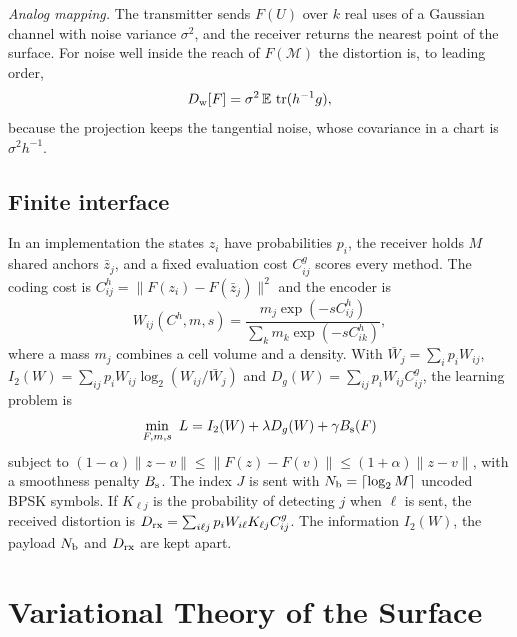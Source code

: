 \documentclass[journal]{IEEEtran}
\newcommand{\E}{\mathbb E}
\newcommand{\M}{\mathcal M}
\DeclareMathOperator{\tr}{tr}
\begin{document}
\emph{Analog mapping.} The transmitter sends $F(U)$ over $k$ real uses of a Gaussian channel with noise variance $\sigma^2$, and the receiver returns the nearest point of the surface. For noise well inside the reach of $F(\M)$ the distortion is, to leading order,
\begin{equation}
 D_{\rm w}[F]=\sigma^2\,\E\,\tr(h^{-1}g), \label{eq:weak}
\end{equation}
because the projection keeps the tangential noise, whose covariance in a chart is $\sigma^2h^{-1}$.

\subsection{Finite interface}
In an implementation the states $z_i$ have probabilities $p_i$, the receiver holds $M$ shared anchors $\bar z_j$, and a fixed evaluation cost $C^g_{ij}$ scores every method. The coding cost is $C^h_{ij}=\|F(z_i)-F(\bar z_j)\|^2$ and the encoder is
\begin{equation}
 W_{ij}(C^h,m,s)=\frac{m_j\exp(-sC^h_{ij})}{\sum_k m_k\exp(-sC^h_{ik})},\label{eq:kernel}
\end{equation}
where a mass $m_j$ combines a cell volume and a density. With $\bar W_j=\sum_ip_iW_{ij}$, $I_2(W)=\sum_{ij}p_iW_{ij}\log_2(W_{ij}/\bar W_j)$ and $D_g(W)=\sum_{ij}p_iW_{ij}C^g_{ij}$, the learning problem is
\begin{equation}
 \min_{F,m,s}\ L=I_2(W)+\lambda D_g(W)+\gamma B_{\rm s}(F) \label{eq:objective}
\end{equation}
subject to $(1-\alpha)\|z-v\|\le\|F(z)-F(v)\|\le(1+\alpha)\|z-v\|$, with a smoothness penalty $B_{\rm s}$. The index $J$ is sent with $N_{\rm b}=\lceil\log_2M\rceil$ uncoded BPSK symbols. If $K_{\ell j}$ is the probability of detecting $j$ when $\ell$ is sent, the received distortion is $D_{\rm rx}=\sum_{i\ell j}p_iW_{i\ell}K_{\ell j}C^g_{ij}$. The information $I_2(W)$, the payload $N_{\rm b}$ and $D_{\rm rx}$ are kept apart.

\section{Variational Theory of the Surface}
\end{document}
